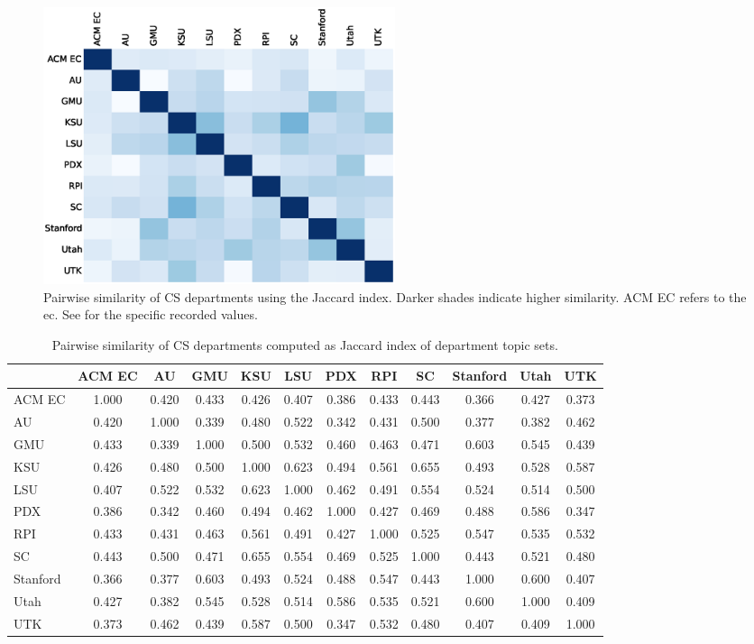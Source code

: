 
\begin{figure}
  \includegraphics[width=0.5\textwidth]{figures/10by10heatmap}
  \caption{Pairwise similarity of CS departments using the Jaccard index. Darker shades indicate higher similarity. ACM EC refers to the \acf{ec}. See  for the specific recorded values.\label{fig:heatmap}}
\end{figure}


\begin{table}
  \centering
  \begin{tabular}{lccccccccccc}
    \toprule
    & ACM EC & AU & GMU & KSU & LSU & PDX & RPI & SC & Stanford & Utah & UTK \\
    \midrule
    ACM EC & 1.000 & 0.420 & 0.433 & 0.426 & 0.407 & 0.386 & 0.433 & 0.443 & 0.366 & 0.427 & 0.373 \\
    AU & 0.420 & 1.000 & 0.339 & 0.480 & 0.522 & 0.342 & 0.431 & 0.500 & 0.377 & 0.382 & 0.462 \\
    GMU & 0.433 & 0.339 & 1.000 & 0.500 & 0.532 & 0.460 & 0.463 & 0.471 & 0.603 & 0.545 & 0.439 \\
    KSU & 0.426 & 0.480 & 0.500 & 1.000 & 0.623 & 0.494 & 0.561 & 0.655 & 0.493 & 0.528 & 0.587 \\
    LSU & 0.407 & 0.522 & 0.532 & 0.623 & 1.000 & 0.462 & 0.491 & 0.554 & 0.524 & 0.514 & 0.500 \\
    PDX & 0.386 & 0.342 & 0.460 & 0.494 & 0.462 & 1.000 & 0.427 & 0.469 & 0.488 & 0.586 & 0.347 \\
    RPI & 0.433 & 0.431 & 0.463 & 0.561 & 0.491 & 0.427 & 1.000 & 0.525 & 0.547 & 0.535 & 0.532 \\
    SC & 0.443 & 0.500 & 0.471 & 0.655 & 0.554 & 0.469 & 0.525 & 1.000 & 0.443 & 0.521 & 0.480 \\
    Stanford & 0.366 & 0.377 & 0.603 & 0.493 & 0.524 & 0.488 & 0.547 & 0.443 & 1.000 & 0.600 & 0.407 \\
    Utah & 0.427 & 0.382 & 0.545 & 0.528 & 0.514 & 0.586 & 0.535 & 0.521 & 0.600 & 1.000 & 0.409 \\
    UTK & 0.373 & 0.462 & 0.439 & 0.587 & 0.500 & 0.347 & 0.532 & 0.480 & 0.407 & 0.409 & 1.000 \\
    \bottomrule
  \end{tabular}
  \caption{Pairwise similarity of CS departments computed as Jaccard index of department topic sets.\label{tbl:heatmap-key}}
\end{table}

